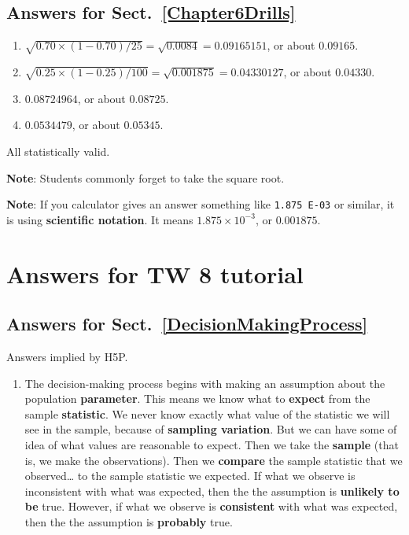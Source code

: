 \documentclass[
  11pt,
  a4paper,
  krantz2]{krantz}
\providecommand{\tightlist}{%
  \setlength{\itemsep}{0pt}\setlength{\parskip}{0pt}}
\begin{document}
\begin{footnotesize}
\subsection*{Answers for Sect.~\ref{Chapter6Drills}}\label{answers-for-sect.-refchapter6drills}

\begin{enumerate}
\def\labelenumi{\arabic{enumi}.}
\tightlist
\item
  \(\sqrt{0.70\times(1 - 0.70)/25} = \sqrt{0.0084} = 0.09165151\), or about \(0.09165\).
\item
  \(\sqrt{0.25\times(1 - 0.25)/100} = \sqrt{0.001875} = 0.04330127\), or about \(0.04330\).
\item
  \(0.08724964\), or about \(0.08725\).
\item
  \(0.0534479\), or about \(0.05345\).
\end{enumerate}

All statistically valid.

\textbf{Note}: Students commonly forget to take the square root.

\textbf{Note}: If you calculator gives an answer something like \texttt{1.875\ E-03} or similar, it is using \textbf{scientific notation}.
It means \(1.875\times 10^{-3}\), or \(0.001875\).

\section{Answers for TW 8 tutorial}\label{Lecture8Answers}

\subsection*{Answers for Sect.~\ref{DecisionMakingProcess}}\label{answers-for-sect.-refdecisionmakingprocess}

Answers implied by H5P.

\begin{enumerate}
\def\labelenumi{\arabic{enumi}.}
\tightlist
\item
  The decision-making process begins with making an assumption about the population \textbf{parameter}.
  This means we know what to \textbf{expect} from the sample \textbf{statistic}. We never know exactly what value of the statistic we will see in the sample, because of \textbf{sampling variation}.
  But we can have some of idea of what values are reasonable to expect.
  Then we take the \textbf{sample} (that is, we make the observations).
  Then we \textbf{compare} the sample statistic that we observed\ldots{} to the sample statistic we expected.
  If what we observe is inconsistent with what was expected, then the the assumption is \textbf{unlikely to be} true.
  However, if what we observe is \textbf{consistent} with what was expected, then the the assumption is \textbf{probably} true.
\end{enumerate}


\end{footnotesize}
\end{document}
